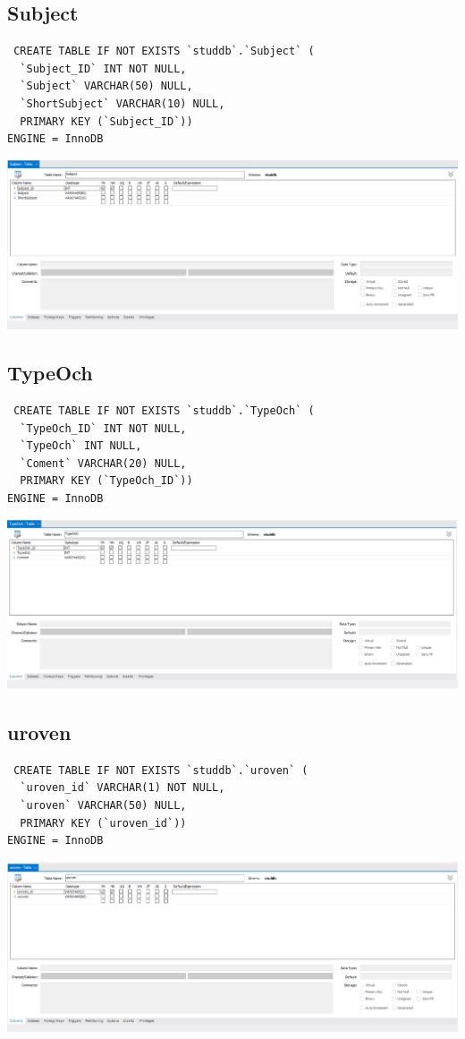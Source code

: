 \documentclass[a4paper, 12pt]{article}
\begin{document}
\subsection{Subject}
\begin{lstlisting}
 CREATE TABLE IF NOT EXISTS `studdb`.`Subject` (
  `Subject_ID` INT NOT NULL,
  `Subject` VARCHAR(50) NULL,
  `ShortSubject` VARCHAR(10) NULL,
  PRIMARY KEY (`Subject_ID`))
ENGINE = InnoDB 
\end{lstlisting}
\includegraphics[width=\textwidth]{2-15.png}

\subsection{TypeOch}
\begin{lstlisting}
 CREATE TABLE IF NOT EXISTS `studdb`.`TypeOch` (
  `TypeOch_ID` INT NOT NULL,
  `TypeOch` INT NULL,
  `Coment` VARCHAR(20) NULL,
  PRIMARY KEY (`TypeOch_ID`))
ENGINE = InnoDB 
\end{lstlisting}
\includegraphics[width=\textwidth]{2-16.png}

\subsection{uroven}
\begin{lstlisting}
 CREATE TABLE IF NOT EXISTS `studdb`.`uroven` (
  `uroven_id` VARCHAR(1) NOT NULL,
  `uroven` VARCHAR(50) NULL,
  PRIMARY KEY (`uroven_id`))
ENGINE = InnoDB 
\end{lstlisting}
\includegraphics[width=\textwidth]{2-17.png}
\end{document}
